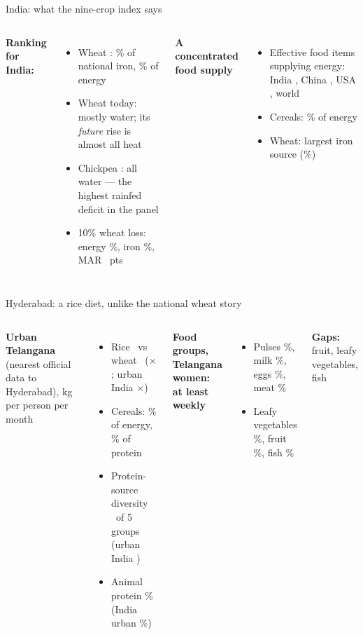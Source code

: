 \begin{frame}{India: what the nine-crop index says}
\begin{columns}[T]
\small
\textbf{Ranking for India:} \indOrder
\begin{itemize}
\item Wheat \indWheatFFour: \indWheatShIron\% of national iron, \indWheatShKcal\% of energy
\item Wheat today: mostly water; its \emph{future} rise is almost all heat
\item Chickpea \indChickpeaFFour: all water --- the highest rainfed deficit in the panel
\item 10\% wheat loss: energy \indWheatShockKcal\%, iron \indWheatShockIron\%, MAR \indWheatShockMar\ pts
\end{itemize}
\small
\textbf{A concentrated food supply}
\begin{itemize}
\item Effective food items supplying energy: India \divIndKcal, China \divChnKcal, USA \divUsaKcal, world \divWorldKcal
\item Cereals: \divIndCereal\% of energy
\item Wheat: largest iron source (\divIndIronTopShare\%)
\end{itemize}
\end{columns}
\end{frame}

\begin{frame}{Hyderabad: a rice diet, unlike the national wheat story}
\begin{columns}[T]
\small
\textbf{Urban Telangana} (nearest official data to Hyderabad), kg per person per month
\begin{itemize}
\item Rice \hqTgUrbanKgRice\ vs wheat \hqTgUrbanKgWheat\ ($\times$\hqTgUrbanRiceToWheat; urban India $\times$\hqInUrbanRiceToWheat)
\item Cereals: \hqKcalCerealTgUrban\% of energy, \hqProtCerealTgUrban\% of protein
\item Protein-source diversity \hqProtEffTgUrban\ of 5 groups (urban India \hqProtEffInUrban)
\item Animal protein \hqProtAnimalTgUrban\% (India urban \hqProtAnimalInUrban\%)
\end{itemize}
\small
\textbf{Food groups, Telangana women: at least weekly}
\begin{itemize}
\item Pulses \hqWeeklyPulses\%, milk \hqWeeklyMilk\%, eggs \hqWeeklyEgg\%, meat \hqWeeklyMeat\%
\item Leafy vegetables \hqWeeklyLeafy\%, fruit \hqWeeklyFruit\%, fish \hqWeeklyFish\%
\end{itemize}
\textbf{Gaps:} fruit, leafy vegetables, fish
\end{columns}
\end{frame}

